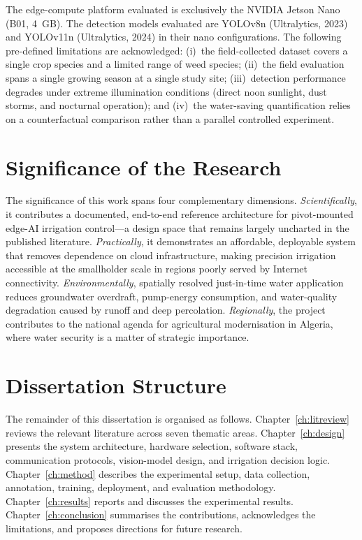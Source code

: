 \documentclass[12pt,a4paper]{report}
\begin{document}
The edge-compute platform evaluated is exclusively the NVIDIA Jetson Nano (B01, 4~GB). The detection models evaluated are YOLOv8n (Ultralytics, 2023) and YOLOv11n (Ultralytics, 2024) in their nano configurations. The following pre-defined limitations are acknowledged: (i)~the field-collected dataset covers a single crop species and a limited range of weed species; (ii)~the field evaluation spans a single growing season at a single study site; (iii)~detection performance degrades under extreme illumination conditions (direct noon sunlight, dust storms, and nocturnal operation); and (iv)~the water-saving quantification relies on a counterfactual comparison rather than a parallel controlled experiment.

\section{Significance of the Research}

The significance of this work spans four complementary dimensions. \emph{Scientifically}, it contributes a documented, end-to-end reference architecture for pivot-mounted edge-AI irrigation control---a design space that remains largely uncharted in the published literature. \emph{Practically}, it demonstrates an affordable, deployable system that removes dependence on cloud infrastructure, making precision irrigation accessible at the smallholder scale in regions poorly served by Internet connectivity. \emph{Environmentally}, spatially resolved just-in-time water application reduces groundwater overdraft, pump-energy consumption, and water-quality degradation caused by runoff and deep percolation. \emph{Regionally}, the project contributes to the national agenda for agricultural modernisation in Algeria, where water security is a matter of strategic importance.

\section{Dissertation Structure}

The remainder of this dissertation is organised as follows. Chapter~\ref{ch:litreview} reviews the relevant literature across seven thematic areas. Chapter~\ref{ch:design} presents the system architecture, hardware selection, software stack, communication protocols, vision-model design, and irrigation decision logic. Chapter~\ref{ch:method} describes the experimental setup, data collection, annotation, training, deployment, and evaluation methodology. Chapter~\ref{ch:results} reports and discusses the experimental results. Chapter~\ref{ch:conclusion} summarises the contributions, acknowledges the limitations, and proposes directions for future research.
\end{document}
